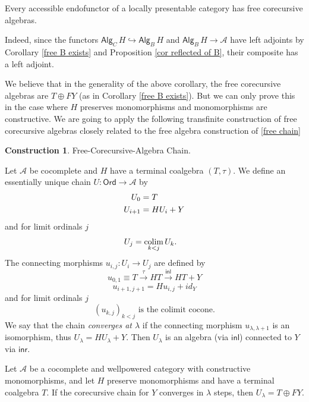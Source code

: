 \documentclass{LMCS}
\theoremstyle{plain}
\theoremstyle{definition}
\newtheorem{construction}[theorem]{Construction}
\numberwithin{equation}{section}
\def\colim{\mathop{\mathrm{colim}}}
\begin{document}
\begin{cor}
Every accessible endofunctor of a locally presentable category has free corecursive algebras.
\end{cor}
Indeed, since the functors $\mathsf{Alg}_C\,H\hookrightarrow \mathsf{Alg}_B\,H$ and $\mathsf{Alg}_B\,H\rightarrow \mathcal A$ have left adjoints by Corollary \ref{free B exists} and Proposition \ref{cor reflected of B}, their composite has a left adjoint.

\begin{rem}
We believe  that in the generality of the above corollary, the free corecursive algebras are $T\oplus FY$ (as in Corollary \ref{free B exists}). But we can only prove this in the case where $H$ preserves monomorphisms and monomorphisms are constructive. We are going to apply the following transfinite construction of free corecursive algebras closely related to the free algebra construction of \ref{free chain}
\end{rem}

\begin{construction}\label{free core.chain}Free-Corecursive-Algebra Chain.

Let $\mathcal A$ be cocomplete and $H$ have a terminal coalgebra $(T,\tau)$. We define an essentially unique chain $U:\mathsf{Ord} \rightarrow \mathcal A$ by
\begin{align}
U_0&=T\notag\\
U_{i+1}&=HU_i+Y\notag
\end{align}
and for limit ordinals $j$
\begin{align}
U_j&=\colim_{k<j}U_k.\notag
\end{align}
The connecting morphisms $u_{i,j}:U_i\rightarrow U_j$ are defined by
$$u_{0,1}\equiv T\stackrel{\tau}\rightarrow HT\stackrel{\mathsf{inl}}\rightarrow HT+Y$$
$$u_{i+1,j+1}=Hu_{i,j}+id_Y$$
and for limit ordinals $j$
$$(u_{k,j})_{k<j} \text{\ is the colimit cocone}.$$
We say that the chain {\it converges at $\lambda$} if the connecting morphism $u_{\lambda,\lambda+1}$ is an isomorphism, thus $U_\lambda=HU_\lambda+Y$. Then $U_\lambda$ is an algebra (via $\mathsf{inl}$) connected to $Y$ via $\mathsf{inr}$.
\end{construction}

\begin{prop}\label{cor chain converges U=T+FY}
Let $\mathcal A$ be a cocomplete and wellpowered category with constructive mono\-morphisms, and let $H$ preserve monomorphisms and have a terminal coalgebra $T$. If the corecursive chain for $Y$ converges in $\lambda$ steps, then $U_\lambda=T\oplus FY$.
\end{prop}
\end{document}
